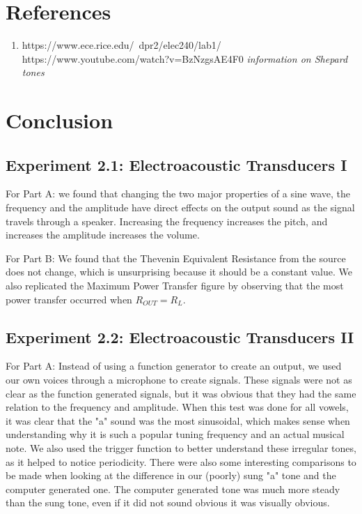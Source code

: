 \documentclass[10pt]{article}
\begin{document}

\section{References}

	\begin{enumerate}
		\item https://www.ece.rice.edu/~dpr2/elec240/lab1/
		https://www.youtube.com/watch?v=BzNzgsAE4F0 \textit{information on Shepard tones}
	\end{enumerate}
\medskip


\section{Conclusion}
\subsection{Experiment 2.1: Electroacoustic Transducers I}
\qquad For Part A: we found that changing the two major properties of a sine wave, the frequency and the amplitude have direct effects on the output sound as the signal travels through a speaker. Increasing the frequency increases the pitch, and increases the amplitude increases the volume.

For Part B: We found that the Thevenin Equivalent Resistance from the source does not change, which is unsurprising because it should be a constant value. We also replicated the Maximum Power Transfer figure by observing that the most power transfer occurred when $R_{OUT} = R_L$. 

\subsection{Experiment 2.2: Electroacoustic Transducers II}
For Part A: Instead of using a function generator to create an output, we used our own voices through a microphone to create signals. These signals were not as clear as the function generated signals, but it was obvious that they had the same relation to the frequency and amplitude. When this test was done for all vowels, it was clear that the "a" sound was the most sinusoidal, which makes sense when understanding why it is such a popular tuning frequency and an actual musical note. We also used the trigger function to better understand these irregular tones, as it helped to notice periodicity. There were also some interesting comparisons to be made when looking at the difference in our (poorly) sung "a" tone and the computer generated one. The computer generated tone was much more steady than the sung tone, even if it did not sound obvious it was visually obvious. 
\end{document}
